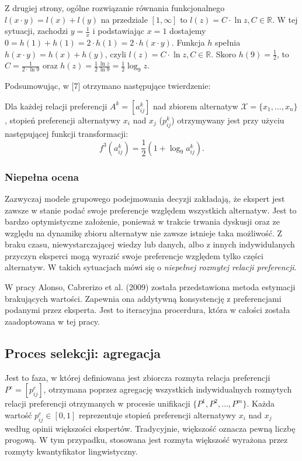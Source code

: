 Z drugiej strony, ogólne rozwiązanie równania funkcjonalnego $l(x \cdot y) =
l(x) + l(y)$ na przedziale $[1, \infty]$ to $l(z) = C \cdot \ln z, C \in
\mathbb{R}.$
W tej sytuacji, zachodzi $y = \frac{1}{x}$ i podstawiając $x = 1$ dostajemy $0
= h(1) + h(1) = 2 \cdot h(1) = 2 \cdot h(x \cdot y).$ Funkcja $h$ spełnia
$h(x \cdot y) = h(x) + h(y)$, czyli $l(z) = C \cdot \ln z, C \in \mathbb{R}.$
Skoro $h(9) = \frac{1}{2}$, to $C = \frac{1}{2 \cdot \ln 9}$ oraz $h(z) =
\frac{1}{2} \frac{\ln z}{\ln 9} = \frac{1}{2} \log_9 z.$

Podsumowując, w [7] otrzymano następujące twierdzenie:
\begin{theorem}
Dla każdej relacji preferencji $A^k = [a^k_{ij}]$ nad zbiorem alternatyw
$\mathcal{X} = \{x_1,\dotsc,x_n\}$, stopień preferencji alternatywy $x_i$ nad
$x_j$ ($p^k_{ij}$) otrzymywany jest przy użyciu następującej funkcji
transformacji:
\begin{equation}
f^3(a^k_{ij}) = \frac{1}{2}(1 + \log_9 a^k_{ij}).
\end{equation}
\end{theorem}

\subsubsection{Niepełna ocena}
Zazwyczaj modele grupowego podejmowania decyzji zakładają, że ekspert jest
zawsze w stanie podać swoje preferencje względem wszystkich alternatyw. Jest to
bardzo optymistyczne założenie, ponieważ w trakcie trwania dyskusji oraz ze
względu na dynamikę zbioru alternatyw nie zawsze istnieje taka możliwość. Z
braku czasu, niewystarczającej wiedzy lub danych, albo z innych indywidulanych
przyczyn eksperci mogą wyrazić swoje preferencje względem tylko części
alternatyw. W takich sytuacjach mówi się o \emph{niepełnej rozmytej relacji
preferencji}.

W pracy Alonso, Cabrerizo et al. (2009) została przedstawiona metoda estymacji
brakujących wartości. Zapewnia ona addytywną konsystencję z preferencjami
podanymi przez eksperta. Jest to iteracyjna procerdura, która w całości została
zaadoptowana w tej pracy.

\subsection{Proces selekcji: agregacja}
Jest to faza, w której definiowana jest zbiorcza rozmyta relacja preferencji
$P^c = [p^c_{ij}]$, otrzymana poprzez agregację wszystkich indywidualnych
rozmytych relacji preferencji otrzymanych w procesie unifikacji $\{ P^1, P^2,
\dotsc, P^m \}$. Każda wartość $p^c_{ij} \in [0,1]$ reprezentuje stopień
preferencji alternatywy $x_i$ nad $x_j$ według opinii większości ekspertów.
Tradycyjnie, większość oznacza pewną liczbę progową. W tym przypadku, stosowana
jest rozmyta większość wyrażona przez rozmyty kwantyfikator lingwistyczny.

